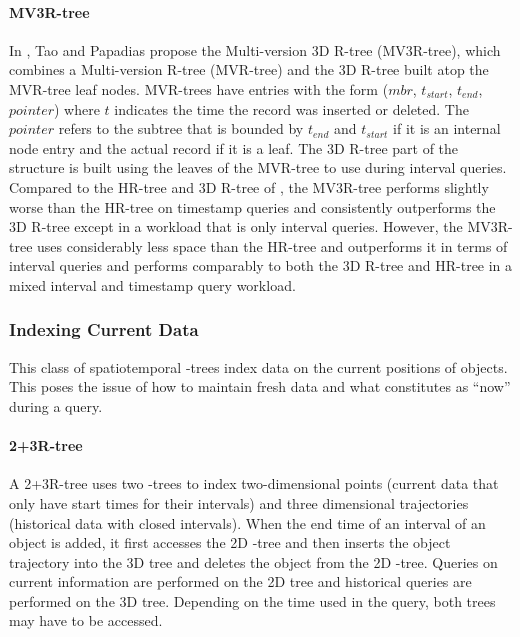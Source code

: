 \paragraph{MV3R-tree} In \cite{tao2001mv3r}, Tao and Papadias propose the 
Multi-version 3D R-tree (MV3R-tree), which combines a Multi-version R-tree (MVR-tree) 
and the 3D R-tree\cite{nascimento1999evaluation} built atop the MVR-tree leaf nodes.
MVR-trees have entries with the form ($mbr$, $t_{start}$, $t_{end}$, $pointer$)
where $t$ indicates the time the record was inserted or deleted. The $pointer$ 
refers to the subtree that is bounded by $t_{end}$ and $t_{start}$ if it is an
internal node entry and the actual record if it is a leaf. The 3D R-tree part
of the structure is built using the leaves of the MVR-tree to use during 
interval queries. Compared to the HR-tree and 3D R-tree of 
\cite{nascimento1999evaluation}, the MV3R-tree performs slightly
worse than the HR-tree on timestamp queries and consistently outperforms the 
3D R-tree except in a workload that is only interval queries. However, the 
MV3R-tree uses considerably less space than the HR-tree and outperforms it 
in terms of interval queries and performs comparably to both the 3D R-tree
and HR-tree in a mixed interval and timestamp query workload.

\subsubsection{Indexing Current Data}
This class of spatiotemporal \rbase-trees index data on the current positions of 
objects. This poses the issue of how to maintain fresh data and what constitutes 
as ``now'' during a query. 

\paragraph{2+3R-tree} A 2+3R-tree\cite{nascimento1999evaluation} uses two 
\rbase-trees to index two-dimensional points (current data that only have
start times for their intervals) and three dimensional trajectories 
(historical data with closed intervals). When the end time of an 
interval of an object is added, it first accesses the 2D \rbase-tree
and then inserts the object trajectory into the 3D tree and deletes the 
object from the 2D \rbase-tree. Queries on current information are 
performed on the 2D tree and historical queries are performed on the 3D
tree. Depending on the time used in the query, both trees may have to be 
accessed.

